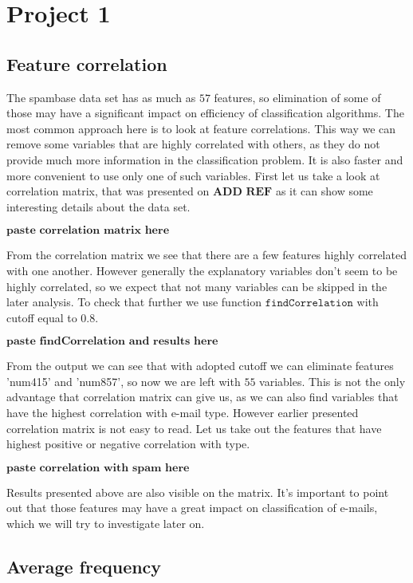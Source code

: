 \documentclass[12pt, letter paper]{article}
\begin{document}
	\section{Project 1}
	\subsection{Feature correlation}
	
	The spambase data set has as much as $57$ features, so elimination of some of those may have a significant impact on efficiency of classification algorithms. The most common approach here is to look at feature correlations. This way we can remove some variables that are highly correlated with others, as they do not provide much more information in the classification problem. It is also faster and more convenient to use only one of such variables. First let us take a look at correlation matrix, that was presented on $\textbf{ADD REF}$ as it can show some interesting details about the data set.
	
	$\textbf{paste correlation matrix here}$
	
	From the correlation matrix we see that there are a few features highly correlated with one another. However generally the explanatory variables don't seem to be highly correlated, so we expect that not many variables can be skipped in the later analysis. To check that further we use function $\texttt{findCorrelation}$ with cutoff equal to $0.8$.
	
	$\textbf{paste findCorrelation and results here}$
	
	From the output we can see that with adopted cutoff we can eliminate features 'num415' and 'num857', so now we are left with $55$ variables. This is not the only advantage that correlation matrix can give us, as we can also find variables that have the highest correlation with e-mail type. However earlier presented correlation matrix is not easy to read. Let us take out the features that have highest positive or negative correlation with type.
	
	$\textbf{paste correlation with spam here}$
	
	Results presented above are also visible on the matrix. It's important to point out that those features may have a great impact on classification of e-mails, which we will try to investigate later on.
	
	\subsection{Average frequency}
	
\end{document}
